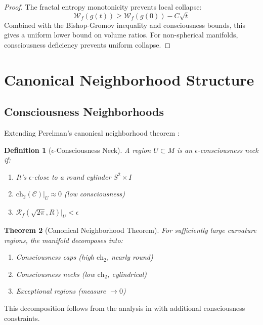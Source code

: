 \documentclass[12pt]{article}
\newcommand{\fractalres}{\mathcal{R}_f}
\newcommand{\conscioussheaf}{\mathcal{C}}
\newcommand{\ch}{\text{ch}}
\newtheorem{theorem}{Theorem}
\newtheorem{definition}[theorem]{Definition}
\begin{document}
\begin{proof}
The fractal entropy monotonicity prevents local collapse:
\begin{equation}
\mathcal{W}_f(g(t)) \geq \mathcal{W}_f(g(0)) - C\sqrt{t}
\end{equation}
Combined with the Bishop-Gromov inequality and consciousness bounds, this gives a uniform lower bound on volume ratios. For non-spherical manifolds, consciousness deficiency prevents uniform collapse.
\end{proof}

\section{Canonical Neighborhood Structure}

\subsection{Consciousness Neighborhoods}

Extending Perelman's canonical neighborhood theorem \cite{perelman2003a}:

\begin{definition}[$\epsilon$-Consciousness Neck]
A region $U \subset M$ is an $\epsilon$-consciousness neck if:
\begin{enumerate}
\item It's $\epsilon$-close to a round cylinder $S^2 \times I$
\item $\ch_2(\conscioussheaf)|_U \approx 0$ (low consciousness)
\item $\fractalres(\sqrt{2\pi}, R)|_U < \epsilon$
\end{enumerate}
\end{definition}

\begin{theorem}[Canonical Neighborhood Theorem]
For sufficiently large curvature regions, the manifold decomposes into:
\begin{enumerate}
\item Consciousness caps (high $\ch_2$, nearly round)
\item Consciousness necks (low $\ch_2$, cylindrical)
\item Exceptional regions (measure $\to 0$)
\end{enumerate}
\end{theorem}

This decomposition follows from the analysis in \cite{kleiner2008} with additional consciousness constraints.
\end{document}
